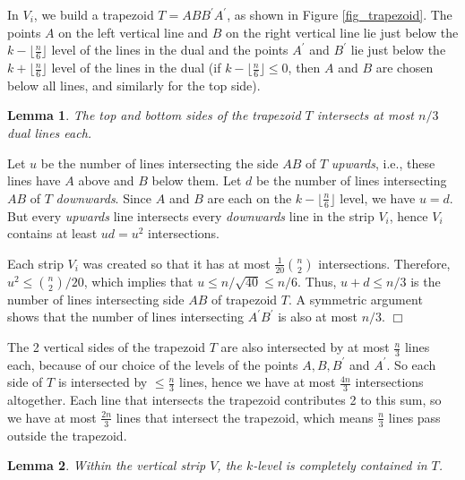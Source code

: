 \documentclass{elsart}
\newtheorem{lemma}{Lemma}
\newenvironment{proof}{{\bf Proof:} \rm}{\hfill $\Box$ \medskip\\}
\begin{document}
In $V_i$, we build a trapezoid $T = ABB^{\prime}A^{\prime}$, as shown
in Figure \ref{fig_trapezoid}. The points $A$ on the left vertical
line and $B$ on the right vertical line lie just below the $k -
\lfloor\frac{n}{6}\rfloor$ level of the lines in the dual and the
points $A^{\prime}$ and $B^{\prime}$ lie just below the $k +
\lfloor\frac{n}{6}\rfloor$ level of the lines in the dual (if $k -
\lfloor\frac{n}{6}\rfloor \le 0$, then $A$ and $B$ are chosen below
all lines, and similarly for the top side).

\begin{lemma}\label{lemma_trapezoid}
The top and bottom sides of the trapezoid $T$ intersects at most 
$n/3$ dual lines each.
\end{lemma}

\begin{proof}
Let $u$ be the number of lines intersecting the side $AB$ of $T$
\emph{upwards}, i.e., these lines have $A$ above and $B$ below them.
Let $d$ be the number of lines intersecting $AB$ of $T$
\emph{downwards}. Since $A$ and $B$ are each on the
$k-\lfloor\frac{n}{6}\rfloor$ level, we have $u = d$. But every
\emph{upwards} line intersects every \emph{downwards} line in the
strip $V_i$, hence $V_i$ contains at least $ud=u^2$ intersections.

Each
strip $V_i$ was created so that it has at most
$\frac{1}{20}{n\choose 2}$ intersections. Therefore, 
            $u^2 \le {n \choose 2}/20$, which implies that
$u \le n/\sqrt{40} \le n/6$.
Thus, $u+d\le n/3$ is the number of lines intersecting side $AB$ of
trapezoid $T$. A symmetric argument shows that the number of lines
intersecting 
$A^{\prime}B^{\prime}$ is also at most $n/3$.
\end{proof}

The 2 vertical sides of the trapezoid $T$ are also intersected by at
most $\frac{n}{3}$ lines each, because of our choice of the levels of
the points $A, B, B^{\prime}$ and $A^{\prime}$. So each side of $T$ is
intersected by $\le \frac{n}{3}$ lines, hence we have at most
$\frac{4n}{3}$ intersections altogether. Each line that intersects the
trapezoid contributes 2 to this sum, so we have at most $\frac{2n}{3}$
lines that intersect the trapezoid, which means $\frac{n}{3}$ lines
pass outside the trapezoid.

\begin{lemma}\label{lemma_trapezoid_containment}
Within the vertical strip $V$, the $k$-level is completely contained
in $T$. 
\end{lemma}
\end{document}
